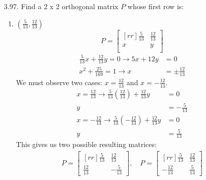 \documentclass[12pt]{article}
\begin{document}
\begin{enumerate}
\begin{enumerate}
	
	\item $A^2$
	\begin{proof}
	Assume that $A$ is symmetric, then $A=A^T$. We show that $A^2=(A^2)^T$.\\
	Note that $A^2 = A*A$. Since $A$ is symmetric, then $A*A=A^T*A^T$ and by the distributive law,$A^T*A^T=(A*A)^T=(A^2)^T$.
	\end{proof}	
	
	\end{enumerate}


\item [3.97.] Find a 2 x 2 orthogonal matrix $P$ whose first row is:
	\begin{enumerate}
	\item $(\frac{5}{13}, \frac{12}{13})$\\
	\[ P= \begin{bmatrix}[rr] \frac{5}{13} & \frac{12}{13}\\ x & y\\ \end{bmatrix}\]
	\begin{align*}
	\frac{5}{13}x + \frac{12}{13}y = 0 \rightarrow 5x+12y &= 0\\
	x^2 + \frac{25}{169} = 1 \rightarrow x &= \pm \frac{12}{13}
	\end{align*}
	We must observe two cases: $x= \frac{12}{13}$ and $x= -\frac{12}{13}$.
	\begin{align*}
	x=\frac{12}{13} \rightarrow \frac{5}{13}(\frac{12}{13}) + \frac{12}{13}y &= 0\\
	y &= -\frac{5}{13}\\
	x=-\frac{12}{13} \rightarrow \frac{5}{13}(-\frac{12}{13}) + \frac{12}{13}y &= 0\\
	y &= \frac{5}{13}
	\end{align*}
	This gives us two possible resulting matrices:
	\begin{align*}
	P= \begin{bmatrix}[rr] \frac{5}{13} & \frac{12}{13}\\ \frac{12}{13} & -\frac{5}{13} \end{bmatrix}, \quad
	P= \begin{bmatrix}[rr] \frac{5}{13} & \frac{12}{13}\\ -\frac{12}{13} & \frac{5}{13} \end{bmatrix}
	\end{align*}
	\end{enumerate}



\end{enumerate}
\end{document}
